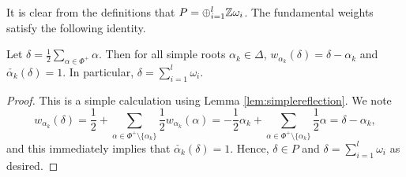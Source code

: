 It is clear from the definitions that $P=\oplus_{i=1}^l\mathbb{Z}\omega_i$. The fundamental weights satisfy the following identity.

\begin{lemma}
    Let $\delta=\frac{1}{2}\sum_{\alpha\in\Phi^+}\alpha$. Then for all simple roots $\alpha_k\in\Delta$, $w_{\alpha_k}(\delta)=\delta-\alpha_k$ and $\check{\alpha_k}(\delta)=1$. In particular, $\delta=\sum_{i=1}^{l}\omega_i$.
\end{lemma}
\begin{proof}
    This is a simple calculation using Lemma \ref{lem:simplereflection}. We note
    $$w_{\alpha_k}(\delta)=\frac{1}{2}+\sum_{\alpha\in\Phi^+\setminus\{\alpha_k\}}\frac{1}{2}w_{\alpha_k}(\alpha)=-\frac{1}{2}\alpha_k+\sum_{\alpha\in\Phi^+\setminus\{\alpha_k\}}\frac{1}{2}\alpha=\delta-\alpha_k,$$
    and this immediately implies that $\check{\alpha_k}(\delta)=1$. Hence, $\delta\in P$ and $\delta=\sum_{i=1}^{l}\omega_i$ as desired.
\end{proof}




